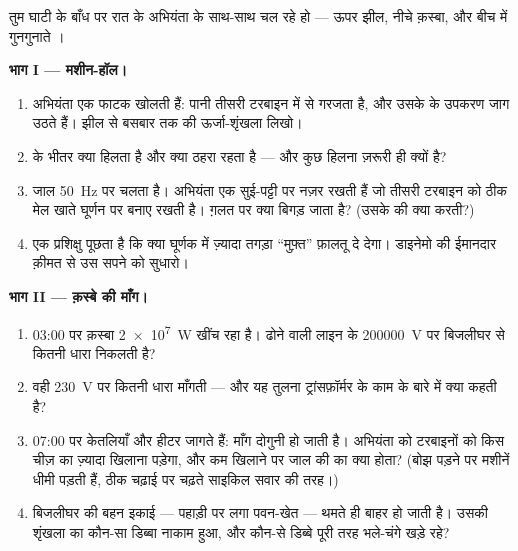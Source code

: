 \begin{problem}\label{pb:g9:alternator:1}
तुम घाटी के बाँध पर रात के अभियंता के साथ-साथ चल रहे हो --- ऊपर झील,
नीचे क़स्बा, और बीच में गुनगुनाते ।

\medskip\noindent\textbf{भाग I --- मशीन-हॉल।}
\begin{enumerate}
  \item अभियंता एक फाटक खोलती हैं: पानी तीसरी टरबाइन में से गरजता है,
        और उसके  के उपकरण जाग उठते हैं। झील से बसबार तक
        की ऊर्जा-शृंखला लिखो।
  \item {} के भीतर क्या हिलता है और क्या ठहरा रहता है ---
        और कुछ हिलना ज़रूरी ही क्यों है?
  \item जाल \qty{50}{Hz} पर चलता है। अभियंता एक सुई-पट्टी पर नज़र
        रखती हैं जो तीसरी टरबाइन को ठीक मेल खाते घूर्णन पर बनाए रखती
        है। ग़लत  पर क्या बिगड़ जाता है? (उसके  की 
        क्या करती?)
  \item एक प्रशिक्षु पूछता है कि क्या घूर्णक में ज़्यादा तगड़ा 
        ``मुफ़्त'' फ़ालतू  दे देगा। डाइनेमो की ईमानदार क़ीमत से
        उस सपने को सुधारो।
\end{enumerate}

\medskip\noindent\textbf{भाग II --- क़स्बे की माँग।}
\begin{enumerate}[resume]
  \item 03:00 पर क़स्बा \qty{2e7}{W} खींच रहा है। ढोने वाली लाइन के
        \qty{200000}{V} पर बिजलीघर से कितनी धारा निकलती है?
  \item वही  \qty{230}{V} पर कितनी धारा माँगती --- और यह तुलना
        ट्रांसफ़ॉर्मर के काम के बारे में क्या कहती है?
  \item 07:00 पर केतलियाँ और हीटर जागते हैं: माँग दोगुनी हो जाती है।
        अभियंता को टरबाइनों को किस चीज़ का ज़्यादा खिलाना पड़ेगा, और
        कम खिलाने पर जाल की  का क्या होता? (बोझ पड़ने पर
        मशीनें धीमी पड़ती हैं, ठीक चढ़ाई पर चढ़ते साइकिल सवार की
        तरह।)
  \item बिजलीघर की बहन इकाई --- पहाड़ी पर लगा पवन-खेत ---  थमते ही
        बाहर हो जाती है। उसकी शृंखला का कौन-सा डिब्बा नाकाम हुआ, और
        कौन-से डिब्बे पूरी तरह भले-चंगे खड़े रहे?
\end{enumerate}


\end{problem}
